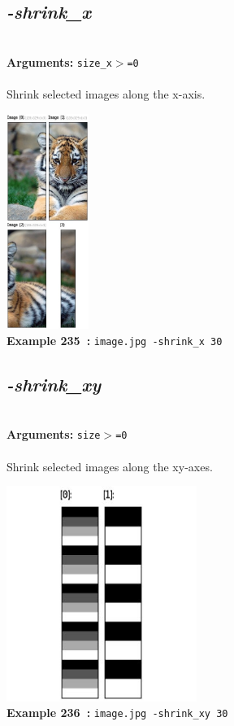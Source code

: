 \documentclass[a4paper,11pt,twoside]{book}
\begin{document}
\subsection{\emph{-shrink\_x} }\vspace*{-0.5em}
~\\\textbf{Arguments: } 
{\small \texttt{size\_x$>$=0}}\\~\\
Shrink selected images along the x-axis.
\begin{center}\includegraphics[keepaspectratio=true,height=7cm,width=\textwidth]{img/gmic_def235.jpg}\\
{\footnotesize \textbf{Example 235~:} \texttt{image.jpg -shrink\_x 30}}
\end{center}

\subsection{\emph{-shrink\_xy} }\vspace*{-0.5em}
~\\\textbf{Arguments: } 
{\small \texttt{size$>$=0}}\\~\\
Shrink selected images along the xy-axes.
\begin{center}\includegraphics[keepaspectratio=true,height=7cm,width=\textwidth]{img/gmic_def236.jpg}\\
{\footnotesize \textbf{Example 236~:} \texttt{image.jpg -shrink\_xy 30}}
\end{center}
\end{document}
